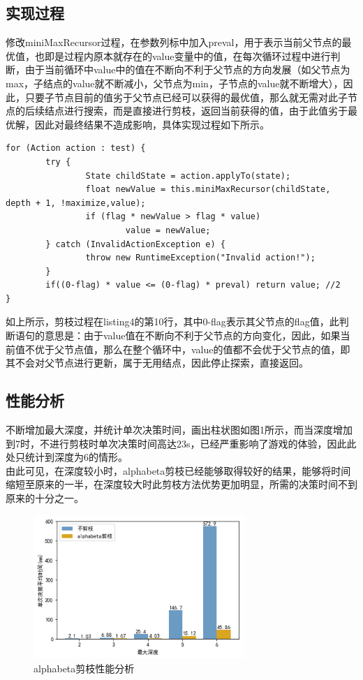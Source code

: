 \documentclass[UTF8]{article}
\begin{document}
\subsection{实现过程}
\indent 修改miniMaxRecursor过程，在参数列标中加入preval，用于表示当前父节点的最优值，也即是过程内原本就存在的value变量中的值，在每次循环过程中进行判断，由于当前循环中value中的值在不断向不利于父节点的方向发展（如父节点为max，子结点的value就不断减小，父节点为min，子节点的value就不断增大），因此，只要子节点目前的值劣于父节点已经可以获得的最优值，那么就无需对此子节点的后续结点进行搜索，而是直接进行剪枝，返回当前获得的值，由于此值劣于最优解，因此对最终结果不造成影响，具体实现过程如下所示。
\begin{lstlisting}[caption=alphabeta剪枝]
for (Action action : test) {
		try {
				State childState = action.applyTo(state);
				float newValue = this.miniMaxRecursor(childState, depth + 1, !maximize,value);
				if (flag * newValue > flag * value) 
						value = newValue;
		} catch (InvalidActionException e) {
				throw new RuntimeException("Invalid action!");
		}
		if((0-flag) * value <= (0-flag) * preval) return value; //2
}
\end{lstlisting}

\indent 如上所示，剪枝过程在listing4的第10行，其中0-flag表示其父节点的flag值，此判断语句的意思是：由于value值在不断向不利于父节点的方向变化，因此，如果当前值不优于父节点值，那么在整个循环中，value的值都不会优于父节点的值，即其不会对父节点进行更新，属于无用结点，因此停止探索，直接返回。

\subsection{性能分析}
\indent 不断增加最大深度，并统计单次决策时间，画出柱状图如图1所示，而当深度增加到7时，不进行剪枝时单次决策时间高达23s，已经严重影响了游戏的体验，因此此处只统计到深度为6的情形。\\
\indent 由此可见，在深度较小时，alphabeta剪枝已经能够取得较好的结果，能够将时间缩短至原来的一半，在深度较大时此剪枝方法优势更加明显，所需的决策时间不到原来的十分之一。

\begin{figure}[ht]
	\centering
	\includegraphics[width=8cm]{ab.png}
	\caption{alphabeta剪枝性能分析}
\end{figure}
\end{document}

